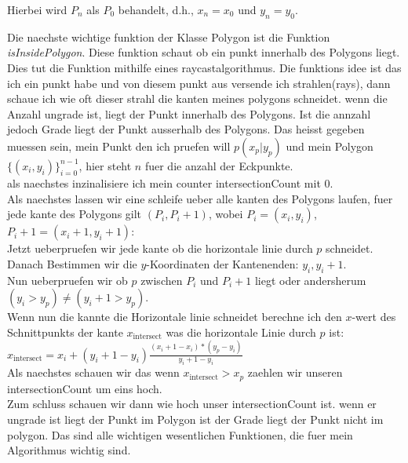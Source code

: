 \documentclass{article}
\begin{document}
Hierbei wird $P_{n}$ als $P_0$ behandelt, d.h., $x_{n} = x_0$ und $y_{n} = y_0$. 
\par\medskip
Die naechste wichtige funktion der Klasse Polygon ist die Funktion \textit{isInsidePolygon}. Diese funktion schaut ob ein punkt innerhalb des Polygons liegt. Dies tut die Funktion mithilfe eines raycastalgorithmus. Die funktions idee ist das ich ein punkt habe und von diesem punkt aus versende ich strahlen(rays), dann schaue ich wie oft dieser strahl die kanten meines polygons schneidet. wenn die Anzahl ungrade ist, liegt der Punkt innerhalb des Polygons. Ist die annzahl jedoch Grade liegt der Punkt ausserhalb des Polygons. Das heisst gegeben muessen sein, mein Punkt den ich pruefen will $p(x_p|y_p)$ und mein Polygon \( \{ (x_i, y_i) \}_{i=0}^{n-1} \), hier steht $n$ fuer die anzahl der Eckpunkte.
\\
als naechstes inzinalisiere ich mein counter intersectionCount mit 0.
\\
Als naechstes lassen wir eine schleife ueber alle kanten des Polygons laufen, fuer jede kante des Polygons gilt $(P_i,P_i+1)$, wobei $P_i = (x_i,y_i)$, $P_i+1 = (x_i+1, y_i+1)$: 
\\
Jetzt ueberpruefen wir jede kante ob die horizontale linie durch $p$ schneidet.
\\
Danach Bestimmen wir die $y$-Koordinaten der Kantenenden: $y_i, y_i+1$.
\\
Nun ueberpruefen wir ob $p$ zwischen $P_i$ und $P_i+1$ liegt oder andersherum $(y_i > y_p) \neq (y_i+1 > y_p)$.
\\
Wenn nun die kannte die Horizontale linie schneidet berechne ich den $x$-wert des Schnittpunkts der kante $x_\text{intersect}$ was die horizontale Linie durch $p$ ist:
\\
$x_\text{intersect} = x_i + (y_i+1 - y_i)\frac{(x_i+1 - x_i) * (y_p - y_i)}{y_i+1 - y_i}$
\\
Als naechstes schauen wir das wenn $x_\text{intersect} > x_p$ zaehlen wir unseren intersectionCount um eins hoch.
\\
Zum schluss schauen wir dann wie hoch unser intersectionCount ist.  wenn er ungrade ist liegt der Punkt im Polygon ist der Grade liegt der Punkt nicht im polygon. Das sind alle wichtigen wesentlichen Funktionen, die fuer mein Algorithmus wichtig sind.
\end{document}
